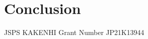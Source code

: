 \documentclass{osa-article}
\begin{document}
\section{Conclusion}


\begin{backmatter}

JSPS KAKENHI Grant Number JP21K13944



\end{backmatter}








\end{document}

